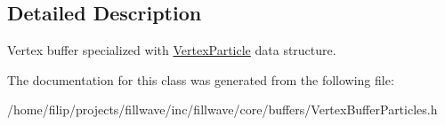 \subsection{Detailed Description}
Vertex buffer specialized with \hyperlink{structflw_1_1flc_1_1VertexParticle}{Vertex\+Particle} data structure. 

The documentation for this class was generated from the following file\+:\begin{DoxyCompactItemize}
\item 
/home/filip/projects/fillwave/inc/fillwave/core/buffers/Vertex\+Buffer\+Particles.\+h\end{DoxyCompactItemize}
